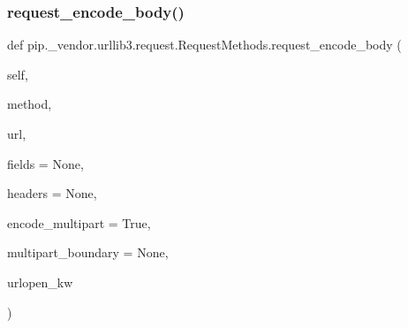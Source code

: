 \subsubsection{\texorpdfstring{request\+\_\+encode\+\_\+body()}{request\_encode\_body()}}
{\footnotesize\ttfamily def pip.\+\_\+vendor.\+urllib3.\+request.\+Request\+Methods.\+request\+\_\+encode\+\_\+body (\begin{DoxyParamCaption}\item[{}]{self,  }\item[{}]{method,  }\item[{}]{url,  }\item[{}]{fields = {\ttfamily None},  }\item[{}]{headers = {\ttfamily None},  }\item[{}]{encode\+\_\+multipart = {\ttfamily True},  }\item[{}]{multipart\+\_\+boundary = {\ttfamily None},  }\item[{}]{urlopen\+\_\+kw }\end{DoxyParamCaption})}

